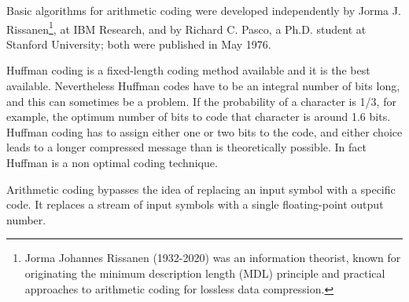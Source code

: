\documentclass[12pt, a4paper]{report}
\begin{document}
Basic algorithms for arithmetic coding were developed independently by Jorma J. Rissanen\footnote{Jorma Johannes Rissanen
(1932-2020) was an information theorist, known for originating the minimum description length (MDL) principle and practical
approaches to arithmetic coding for lossless data compression.}, at IBM Research, and by Richard C. Pasco, a Ph.D. student at
Stanford University; both were published in May 1976.

Huffman coding is a fixed-length coding method available and it is the best available.
Nevertheless Huffman codes have to be an integral number of bits long, and this can sometimes be a problem.
If the probability of a character is 1/3, for example, the optimum number of bits to code that character is around 1.6 bits.
Huffman coding has to assign either one or two bits to the code, and either choice leads to a longer compressed message than is
theoretically possible. In fact Huffman is a non optimal coding technique.

Arithmetic coding bypasses the idea of replacing an input symbol with a specific code.
It replaces a stream of input symbols with a single floating-point output number.
\end{document}
